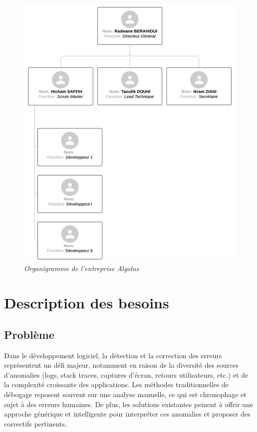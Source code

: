 \documentclass[12pt,a4paper]{report}
\begin{document}
	\begin{figure}[H]
		\centering
		\includegraphics[width=1\textwidth]{algolus-organigramme.png}
		\caption{\textit{Organigramme de l'entreprise Algolus}}
		\label{fig:algolus-organigramme}
	\end{figure}
	
	\section{Description des besoins}
	
	\subsection{Problème}
	
	Dans le développement logiciel, la détection et la correction des erreurs représentent un défi majeur, notamment en raison de la diversité des sources d’anomalies (logs, stack traces, captures d’écran, retours utilisateurs, etc.) et de la complexité croissante des applications. Les méthodes traditionnelles de débogage reposent souvent sur une analyse manuelle, ce qui est chronophage et sujet à des erreurs humaines. De plus, les solutions existantes peinent à offrir une approche générique et intelligente pour interpréter ces anomalies et proposer des correctifs pertinents.
	
\end{document}
